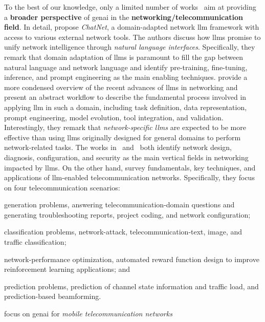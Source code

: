 To the best of our knowledge, only a limited number of works~\cite{huang2023large, celik2024dawn, liu2024large, zhou2024large} aim at providing a \textbf{broader perspective} of \gls{genai} in the \textbf{networking/telecommunication field}.
In detail,
\citet{huang2023large} 
propose \emph{ChatNet}, a domain-adapted network \gls{llm} framework with access to various external network tools.
The authors discuss how \glspl{llm} promise to unify network intelligence through \emph{natural language interfaces}. 
Specifically, they remark that domain adaptation of \glspl{llm} is paramount to fill the gap between natural language and network language
and identify pre-training, fine-tuning, inference, and prompt engineering as the main enabling techniques.
\citet{liu2024large}
provide a more condensed overview of the recent advances of \glspl{llm} in networking and 
present an abstract workflow to describe the fundamental process involved in applying \gls{llm} in such a domain, including
task definition, data representation, prompt engineering, model evolution, tool integration, and validation.
Interestingly, they 
remark that \emph{network-specific \glspl{llm}} are expected to be more effective
than using \glspl{llm} originally designed for general domains to perform network-related tasks.
The works in~\cite{huang2023large} and~\cite{liu2024large} both identify
network design, 
diagnosis,
configuration, and
security
as the main vertical fields in networking  
impacted by \glspl{llm}.
On the other hand,
\citet{zhou2024large}
survey fundamentals, key techniques, and applications of \gls{llm}-enabled telecommunication networks.
Specifically, they focus on four telecommunication scenarios:
\begin{enumerate*}[label=(\emph{\roman*})]
    \item generation problems, \ie answering telecommunication-domain questions and generating troubleshooting reports, project coding, and network configuration;
    \item classification problems, \ie network-attack, telecommunication-text, image, and traffic classification;
    \item network-performance optimization, \ie automated reward function design to improve reinforcement learning applications; and 
    \item prediction problems, \ie prediction of channel state information and traffic load, and prediction-based beamforming.
\end{enumerate*}
\citet{karapantelakis2024generative} 
focus on \gls{genai} for \emph{mobile telecommunication networks} 
